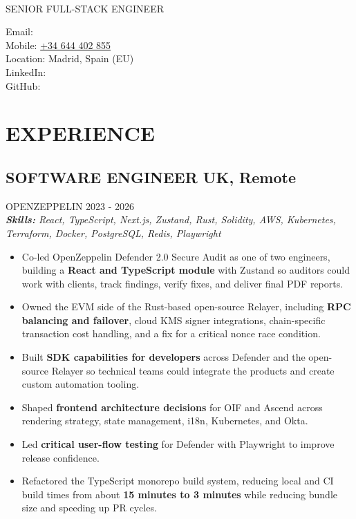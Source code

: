 \documentclass{article}
\newcommand{\WorkExperience}[2]{
   \subsection*{#1}
   \vspace{-1em}
   \uppercase{#2}
}
\newcommand{\Skills}[1]{
   \textit{\textbf{Skills:} #1}
}
\begin{document}
\begin{center}
	\begin{minipage}{0.5\textwidth}
		{\fontsize{24}{28}\Title{}} \\
		\bigskip
		{\normalsize \MakeUppercase{Senior Full-Stack Engineer}}
	\end{minipage} \hfill
	\begin{minipage}{0.4\textwidth}
		\raggedleft{}
		Email: \href{mailto:\ResumeEmail}{\ResumeEmail} \\
		Mobile: \href{tel:+34644402855}{+34 644 402 855}  \\
		Location: Madrid, Spain (EU) \\
		LinkedIn: \href{\ResumeLinkedInUrl}{\ResumeLinkedInLabel} \\
		GitHub: \href{\ResumeGitHubUrl}{\ResumeGitHubLabel}
	\end{minipage}
\end{center}

\vspace{-3em}

\phantom{Amazon, Microsoft, Facebook} %

\section*{EXPERIENCE}
\WorkExperience{SOFTWARE ENGINEER \hfill UK, Remote}{OpenZeppelin \hfill 2023 {-} 2026} \\
\Skills{React, TypeScript, Next.js, Zustand, Rust, Solidity, AWS, Kubernetes, Terraform, Docker, PostgreSQL, Redis, Playwright}
\begin{itemize}
\item Co-led OpenZeppelin Defender 2.0 Secure Audit as one of two engineers, building a \textbf{React and TypeScript module} with Zustand so auditors could work with clients, track findings, verify fixes, and deliver final PDF reports.
\item Owned the EVM side of the Rust-based open-source Relayer, including \textbf{RPC balancing and failover}, cloud KMS signer integrations, chain-specific transaction cost handling, and a fix for a critical nonce race condition.
\item Built \textbf{SDK capabilities for developers} across Defender and the open-source Relayer so technical teams could integrate the products and create custom automation tooling.
\item Shaped \textbf{frontend architecture decisions} for OIF and Ascend across rendering strategy, state management, i18n, Kubernetes, and Okta.
\item Led \textbf{critical user-flow testing} for Defender with Playwright to improve release confidence.
\item Refactored the TypeScript monorepo build system, reducing local and CI build times from about \textbf{15 minutes to 3 minutes} while reducing bundle size and speeding up PR cycles.
\end{itemize}
\end{document}
